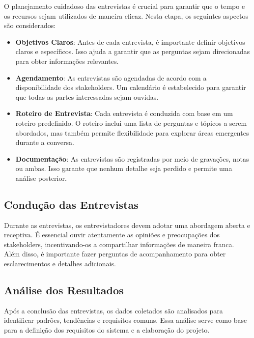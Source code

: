 O planejamento cuidadoso das entrevistas é crucial para garantir que o tempo e os recursos sejam utilizados de maneira eficaz. Nesta etapa, os seguintes aspectos são considerados:

\begin{itemize}
	\item \textbf{Objetivos Claros}: Antes de cada entrevista, é importante definir objetivos claros e específicos. Isso ajuda a garantir que as perguntas sejam direcionadas para obter informações relevantes.
	
	\item \textbf{Agendamento}: As entrevistas são agendadas de acordo com a disponibilidade dos stakeholders. Um calendário é estabelecido para garantir que todas as partes interessadas sejam ouvidas.
	
	\item \textbf{Roteiro de Entrevista}: Cada entrevista é conduzida com base em um roteiro predefinido. O roteiro inclui uma lista de perguntas e tópicos a serem abordados, mas também permite flexibilidade para explorar áreas emergentes durante a conversa.
	
	\item \textbf{Documentação}: As entrevistas são registradas por meio de gravações, notas ou ambas. Isso garante que nenhum detalhe seja perdido e permite uma análise posterior.
\end{itemize}

\subsection{Condução das Entrevistas}

Durante as entrevistas, os entrevistadores devem adotar uma abordagem aberta e receptiva. É essencial ouvir atentamente as opiniões e preocupações dos stakeholders, incentivando-os a compartilhar informações de maneira franca. Além disso, é importante fazer perguntas de acompanhamento para obter esclarecimentos e detalhes adicionais.

\subsection{Análise dos Resultados}

Após a conclusão das entrevistas, os dados coletados são analisados para identificar padrões, tendências e requisitos comuns. Essa análise serve como base para a definição dos requisitos do sistema e a elaboração do projeto.

